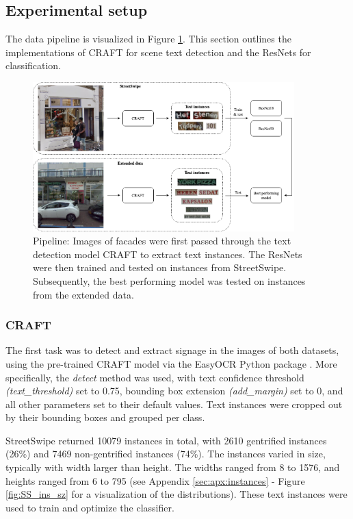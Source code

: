 \subsection{Experimental setup}

The data pipeline is visualized in Figure \ref{fig:pipeline}. This section outlines the implementations of CRAFT for scene text detection and the ResNets for classification.

\begin{figure}
    \centering
    \includegraphics[width=0.9\textwidth]{media/methodology/Pipeline.png}
    \caption{Pipeline: Images of facades were first passed through the text detection model CRAFT to extract text instances. The ResNets were then trained and tested on instances from StreetSwipe. Subsequently, the best performing model was tested on instances from the extended data.}
    \label{fig:pipeline}
\end{figure}


\subsubsection{CRAFT}

The first task was to detect and extract signage in the images of both datasets, using the pre-trained CRAFT model via the EasyOCR Python package \cite{noauthor_jaided_nodate}. More specifically, the \textit{detect} method was used, with text confidence threshold \textit{(text\_threshold)} set to 0.75, bounding box extension \textit{(add\_margin)} set to 0, and all other parameters set to their default values. Text instances were cropped out by their bounding boxes and grouped per class.

StreetSwipe returned 10079 instances in total, with 2610 gentrified instances (26\%) and 7469 non-gentrified instances (74\%). The instances varied in size, typically with width larger than height. The widths ranged from 8 to 1576, and heights ranged from 6 to 795 (see Appendix \ref{sec:apx:instances} - Figure \ref{fig:SS_ins_sz} for a visualization of the distributions). These text instances were used to train and optimize the classifier.

